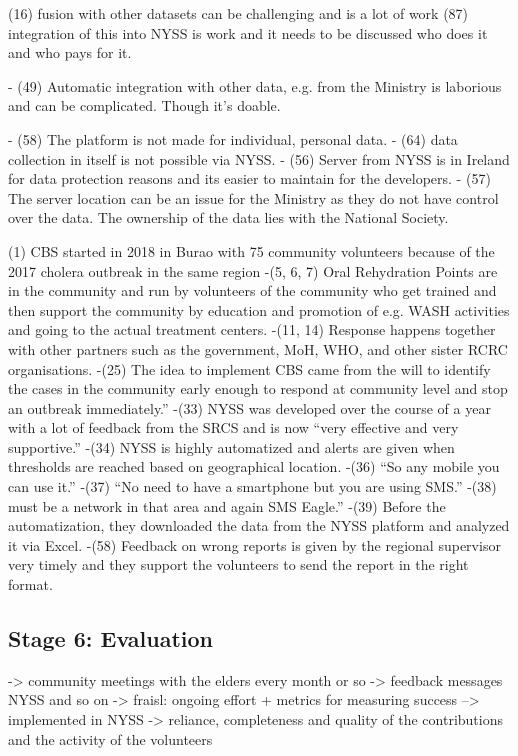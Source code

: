 (16) fusion with other datasets can be challenging and is a lot of work
(87) integration of this into NYSS is work and it needs to be discussed who does it and who pays for it.

-	(49) Automatic integration with other data, e.g. from the Ministry is laborious and can be complicated. Though it’s doable.

-	(58) The platform is not made for individual, personal data.
-	(64) data collection in itself is not possible via NYSS.
-	(56) Server from NYSS is in Ireland for data protection reasons and its easier to maintain for the developers.
-	(57) The server location can be an issue for the Ministry as they do not have control over the data. The ownership of the data lies with the National Society. 




(1) CBS started in 2018 in Burao with 75 community volunteers because of the 2017 cholera outbreak in the same region
-(5, 6, 7) Oral Rehydration Points are in the community and run by volunteers of the community who get trained and then support the community by education and promotion of e.g. WASH activities and going to the actual treatment centers.
-(11, 14) Response happens together with other partners such as the government, MoH, WHO, and other sister RCRC organisations.
-(25) The idea to implement CBS came from the will to identify the cases in the community early enough to respond at community level and stop an outbreak immediately.”
-(33) NYSS was developed over the course of a year with a lot of feedback from the SRCS and is now “very effective and very supportive.”
-(34) NYSS is highly automatized and alerts are given when thresholds are reached based on geographical location.
-(36) “So any mobile you can use it.”
-(37) “No need to have a smartphone but you are using SMS.”
-(38) must be a network in that area and again SMS Eagle.”
-(39) Before the automatization, they downloaded the data from the NYSS platform and analyzed it via Excel.
-(58) Feedback on wrong reports is given by the regional supervisor very timely and they support the volunteers to send the report in the right format.






\subsection{Stage 6: Evaluation}
-> community meetings with the elders every month or so
-> feedback messages NYSS and so on
-> fraisl: ongoing effort + metrics for measuring success --> implemented in NYSS -> reliance, completeness and quality of the contributions and the activity of the volunteers




